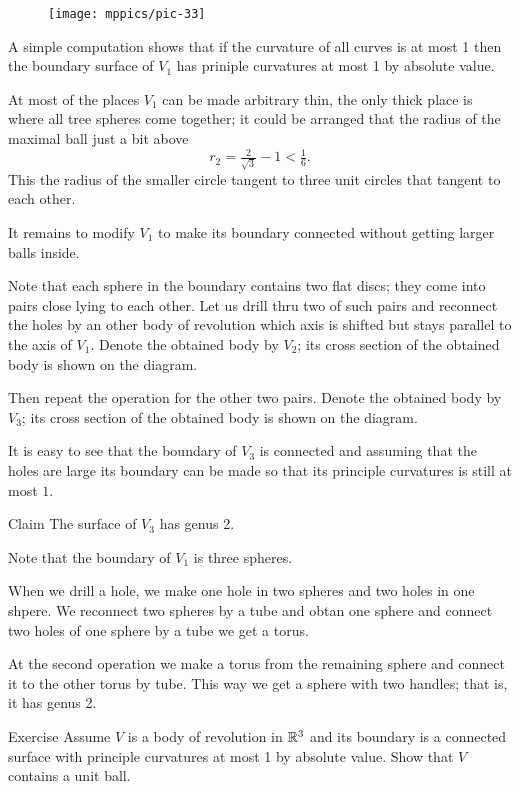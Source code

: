 \begin{figure}[h!]%
\centering
\texttt{[image: mppics/pic-33]}
\vskip0mm
\end{figure}

A simple computation shows that if the curvature of all curves is at most 1 then the boundary surface of $V_1$ has priniple curvatures at most 1 by absolute value.

At most of the places $V_1$ can be made arbitrary thin,
the only thick place is where all tree spheres come together;
it could be arranged that the radius of the maximal ball just a bit above 
\[r_2=\tfrac2{\sqrt{3}}-1< \tfrac16.\]
This the radius of the smaller circle tangent to three unit circles that tangent to each other.


It remains to modify $V_1$ to make its boundary connected without  getting larger balls inside.

Note that each sphere in the boundary contains two flat discs;
they come into pairs close lying to each other. 
Let us drill thru two of such pairs and reconnect the holes by an other body of revolution which axis is shifted but stays parallel to the axis of $V_1$.
Denote the obtained body by $V_2$; its cross section of the obtained body is shown on the diagram. 

Then repeat the operation for the other two pairs.
Denote the obtained body by $V_3$; its cross section of the obtained body is shown on the diagram.

It is easy to see that the boundary of $V_3$ is connected
and assuming that the holes are large its boundary can be made so that its principle curvatures is still at most $1$.
\qeds

\begin{thm}{Claim}
The surface of $V_3$ has genus 2.
\end{thm}


Note that the boundary of $V_1$ is three spheres.

When we drill a hole, we make one hole in two spheres and two holes in one shpere.
We reconnect two spheres by a tube and obtan one sphere
and connect two holes of one sphere by a tube we get a torus.

At the second operation we make a torus from the remaining sphere and connect it to the other torus by tube.
This way we get a sphere with two handles; that is, it has genus 2.
\qeds

\begin{thm}{Exercise}
Assume $V$ is a body of revolution in $\mathbb{R}^3$ and its boundary is a connected surface with principle curvatures at most 1 by absolute value.
Show that $V$ contains a unit ball.
\end{thm}

